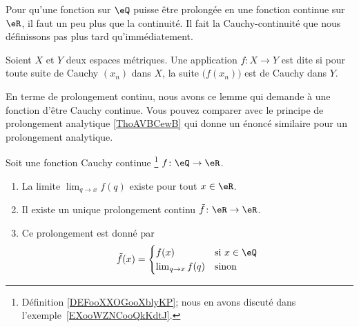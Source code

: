 Pour qu'une fonction sur \( \eQ\) puisse être prolongée en une fonction continue sur \( \eR\), il faut un peu plus que la continuité. Il fait la Cauchy-continuité que nous définissons pas plus tard qu'immédiatement.

\begin{definition}        \label{DEFooXXOGooXblyKP}
    Soient \( X\) et \( Y\) deux espaces métriques. Une application \( f\colon X\to Y\) est dite  si pour toute suite de Cauchy \( (x_n)\) dans \( X\), la suite \( \big( f(x_n) \big)\) est de Cauchy dans \( Y\).
\end{definition}

En terme de prolongement continu, nous avons ce lemme qui demande à une fonction d'être Cauchy continue. Vous pouvez comparer avec le principe de prolongement analytique \ref{ThoAVBCewB} qui donne un énoncé similaire pour un prolongement analytique.
\begin{lemma}        \label{LEMooUAFBooAwiXxj}
    Soit une fonction Cauchy continue \footnote{Définition \ref{DEFooXXOGooXblyKP}; nous en avons discuté dans l'exemple~\ref{EXooWZNCooQkKdtJ}.} \( f\colon \eQ\to \eR\).
    \begin{enumerate}
        \item
            La limite \( \lim_{q\to x} f(q)\) existe pour tout \( x\in \eR\).
        \item
            Il existe un unique prolongement continu \( \tilde f\colon \eR\to \eR\).
        \item
            Ce prolongement est donné par
            \begin{equation}
            \tilde f(x)=\begin{cases}
                f(x)    &   \text{si } x\in \eQ\\
                \lim_{q\to x} f(q)    &    \text{sinon }
            \end{cases}
        \end{equation}
    \end{enumerate}
\end{lemma}

